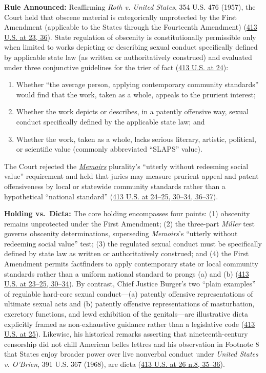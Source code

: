\documentclass[12pt]{article}
\begin{document}
\textbf{Rule Announced:} Reaffirming \textit{Roth v. United States}, 354 U.S. 476 (1957), the Court held that obscene material is categorically unprotected by the First Amendment (applicable to the States through the Fourteenth Amendment) (\href{https://supreme.justia.com/cases/federal/us/413/15/}{413 U.S. at 23, 36}). State regulation of obscenity is constitutionally permissible only when limited to works depicting or describing sexual conduct specifically defined by applicable state law (as written or authoritatively construed) and evaluated under three conjunctive guidelines for the trier of fact (\href{https://supreme.justia.com/cases/federal/us/413/15/}{413 U.S. at 24}):
\begin{enumerate}
\item[(a)] Whether ``the average person, applying contemporary community standards'' would find that the work, taken as a whole, appeals to the prurient interest;
\item[(b)] Whether the work depicts or describes, in a patently offensive way, sexual conduct specifically defined by the applicable state law; and
\item[(c)] Whether the work, taken as a whole, lacks serious literary, artistic, political, or scientific value (commonly abbreviated ``SLAPS'' value).
\end{enumerate}
The Court rejected the \href{https://supreme.justia.com/cases/federal/us/383/413/}{\textit{Memoirs}} plurality's ``utterly without redeeming social value'' requirement and held that juries may measure prurient appeal and patent offensiveness by local or statewide community standards rather than a hypothetical ``national standard'' (\href{https://supreme.justia.com/cases/federal/us/413/15/}{413 U.S. at 24--25, 30--34, 36--37}).

\textbf{Holding vs.\ Dicta:} The core holding encompasses four points: (1) obscenity remains unprotected under the First Amendment; (2) the three-part \textit{Miller} test governs obscenity determinations, superseding \textit{Memoirs}'s ``utterly without redeeming social value'' test; (3) the regulated sexual conduct must be specifically defined by state law as written or authoritatively construed; and (4) the First Amendment permits factfinders to apply contemporary state or local community standards rather than a uniform national standard to prongs (a) and (b) (\href{https://supreme.justia.com/cases/federal/us/413/15/}{413 U.S. at 23--25, 30--34}). By contrast, Chief Justice Burger's two ``plain examples'' of regulable hard-core sexual conduct---(a) patently offensive representations of ultimate sexual acts and (b) patently offensive representations of masturbation, excretory functions, and lewd exhibition of the genitals---are illustrative dicta explicitly framed as non-exhaustive guidance rather than a legislative code (\href{https://supreme.justia.com/cases/federal/us/413/15/}{413 U.S. at 25}). Likewise, his historical remarks asserting that nineteenth-century censorship did not chill American belles lettres and his observation in Footnote 8 that States enjoy broader power over live nonverbal conduct under \textit{United States v. O'Brien}, 391 U.S. 367 (1968), are dicta (\href{https://supreme.justia.com/cases/federal/us/413/15/}{413 U.S. at 26 n.8, 35--36}).
\end{document}
